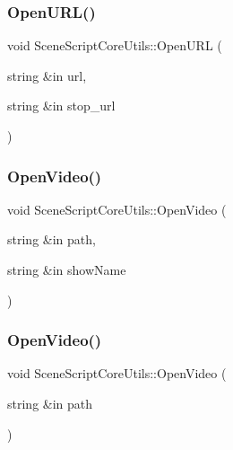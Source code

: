 \hypertarget{class_scene_script_core_utils_a4e1b43e01447ffe267b52b8d7b8369a3}{}\label{class_scene_script_core_utils_a4e1b43e01447ffe267b52b8d7b8369a3} 
\subsubsection{\texorpdfstring{Open\+U\+R\+L()}{OpenURL()}\hspace{0.1cm}{\footnotesize\ttfamily [2/2]}}
{\footnotesize\ttfamily void Scene\+Script\+Core\+Utils\+::\+Open\+U\+RL (\begin{DoxyParamCaption}\item[{string \&in}]{url,  }\item[{string \&in}]{stop\+\_\+url }\end{DoxyParamCaption})}

\hypertarget{class_scene_script_core_utils_a5e52a560b264f2b2ee8f6579e031459d}{}\label{class_scene_script_core_utils_a5e52a560b264f2b2ee8f6579e031459d} 
\subsubsection{\texorpdfstring{Open\+Video()}{OpenVideo()}\hspace{0.1cm}{\footnotesize\ttfamily [1/2]}}
{\footnotesize\ttfamily void Scene\+Script\+Core\+Utils\+::\+Open\+Video (\begin{DoxyParamCaption}\item[{string \&in}]{path,  }\item[{string \&in}]{show\+Name }\end{DoxyParamCaption})}

\hypertarget{class_scene_script_core_utils_a9c84f8e58f032546cb230a655956f941}{}\label{class_scene_script_core_utils_a9c84f8e58f032546cb230a655956f941} 
\subsubsection{\texorpdfstring{Open\+Video()}{OpenVideo()}\hspace{0.1cm}{\footnotesize\ttfamily [2/2]}}
{\footnotesize\ttfamily void Scene\+Script\+Core\+Utils\+::\+Open\+Video (\begin{DoxyParamCaption}\item[{string \&in}]{path }\end{DoxyParamCaption})}

